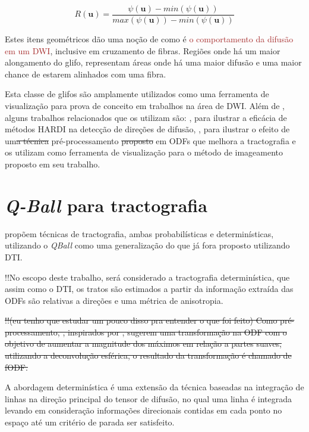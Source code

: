 \documentclass[
    12pt,                %
    oneside,            %
    a4paper,            %
    english,            %
    french,                %
    spanish,            %
    brazil                %
    ]{abntex2}
\begin{document}
\begin{equation}
\label{eq::normglifo}
    R(\mathbf{u}) = \frac{\psi(\mathbf{u}) - min(\psi(\mathbf{u}))}{max(\psi(\mathbf{u})) - min(\psi(\mathbf{u}))}
\end{equation}

Estes itens geométricos dão uma noção de como é \textcolor{brown}{o comportamento da difusão em um DWI}, inclusive em cruzamento de fibras. Regiões onde há um maior alongamento do glifo, representam áreas onde há uma maior difusão e uma maior chance de estarem alinhados com uma fibra.

Esta classe de glifos são amplamente utilizados como uma ferramenta de visualização para prova de conceito em trabalhos na área de DWI. Além de , alguns trabalhos relacionados que os utilizam são: , para ilustrar a eficácia de métodos HARDI na detecção de direções de difusão, , para ilustrar o efeito de um\sout{a técnica} pré-processamento \sout{proposto} em ODFs que melhora a tractografia e  os utilizam como ferramenta de visualização para o método de imageamento proposto em seu trabalho.


\section{\textit{Q-Ball} para tractografia}
\label{QBall_para_tractografia}

 propõem técnicas de tractografia, ambas probabilísticas e determinísticas, utilizando o \textit{QBall} como uma generalização do que já fora proposto utilizando DTI.

!!No escopo deste trabalho, será considerado a tractografia determinística, que assim como o DTI, os tratos são estimados a partir da informação extraída das ODFs são relativas a direções e uma métrica de anisotropia.

\sout{!!(eu tenho que estudar um pouco disso pra entender o que foi feito)
Como pré-processamento, , inspirados por , sugerem uma transformação na ODF com o objetivo de aumentar a magnitude dos máximos em relação a partes suaves, utilizando a deconvolução esférica, o resultado da transformação é chamado de fODF.}

A abordagem determinística é uma extensão da técnica baseadas na integração de linhas na direção principal do tensor de difusão, no qual uma linha é integrada levando em consideração informações direcionais contidas em cada ponto no espaço até um critério de parada ser satisfeito.
\end{document}
